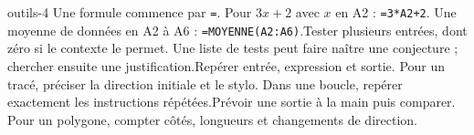 \begin{blocEdition}{outils-4}
Une formule commence par \texttt{=}. Pour $3x+2$ avec $x$ en A2 : \texttt{=3*A2+2}. Une moyenne de données en A2 à A6 : \texttt{=MOYENNE(A2:A6)}.Tester plusieurs entrées, dont zéro si le contexte le permet. Une liste de tests peut faire naître une conjecture ; chercher ensuite une justification.Repérer entrée, expression et sortie. Pour un tracé, préciser la direction initiale et le stylo. Dans une boucle, repérer exactement les instructions répétées.Prévoir une sortie à la main puis comparer. Pour un polygone, compter côtés, longueurs et changements de direction.
\end{blocEdition}
